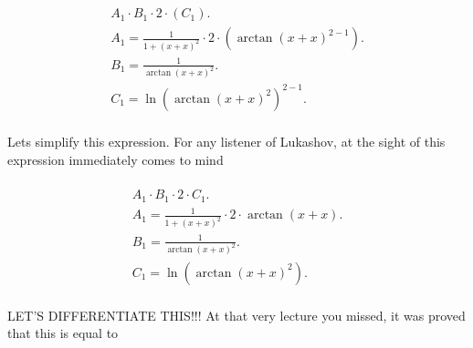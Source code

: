 \documentclass[12pt,a4paper]{extreport}
\begin{document}
\begin{multline}
\\
A_{1} \cdot B_{1} \cdot 2 \cdot (C_{1}).\\
A_{1} = \frac{1}{1 + (x + x) ^ {2}} \cdot 2 \cdot (\arctan(x + x) ^ {2 - 1}).\\
B_{1} = \frac{1}{\arctan(x + x) ^ {2}}.\\
C_{1} = \ln(\arctan(x + x) ^ {2}) ^ {2 - 1}.\\
\end{multline}


Lets simplify this expression.
For any listener of Lukashov, at the sight of this expression immediately comes to mind 

\begin{multline}
\\
A_{1} \cdot B_{1} \cdot 2 \cdot C_{1}.\\
A_{1} = \frac{1}{1 + (x + x) ^ {2}} \cdot 2 \cdot \arctan(x + x).\\
B_{1} = \frac{1}{\arctan(x + x) ^ {2}}.\\
C_{1} = \ln(\arctan(x + x) ^ {2}).\\
\end{multline}


LET'S DIFFERENTIATE THIS!!!
At that very lecture you missed, it was proved that this is equal to 
\end{document}
